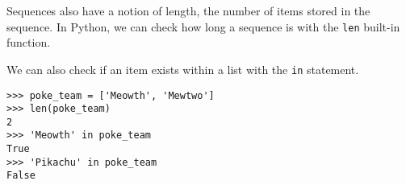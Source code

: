 Sequences also have a notion of length, the number of items stored in
the sequence. In Python, we can check how long a sequence is with the
\texttt{len} built-in function.

We can also check if an item exists within a list with the \texttt{in}
statement.

\begin{lstlisting}
>>> poke_team = ['Meowth', 'Mewtwo']
>>> len(poke_team)
2
>>> 'Meowth' in poke_team
True
>>> 'Pikachu' in poke_team
False
\end{lstlisting}
